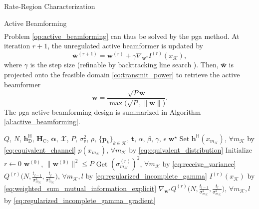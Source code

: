 \begin{section}{Rate-Region Characterization}
\begin{subsection}{Active Beamforming}
\begin{equation}
\begin{split}
			\end{split}
		\end{equation}
		Problem \eqref{op:active_beamforming} can thus be solved by the \gls{pga} method.
		At iteration $r+1$, the unregulated active beamformer is updated by
		\begin{equation}
			\bar{\mathbf{w}}^{(r+1)} = \mathbf{w}^{(r)}+\gamma\nabla_{\mathbf{w}^*} I^{(r)}(x_{\mathcal{K}}),
			\label{eq:beamforming_gradient_ascent}
		\end{equation}
		where $\gamma$ is the step size (refinable by backtracking line search \cite[Section 9.2]{Boyd2004}).
		Then, $\bar{\mathbf{w}}$ is projected onto the feasible domain \eqref{co:transmit_power} to retrieve the active beamformer
		\begin{equation}
			\mathbf{w} = \frac{\sqrt{P} \bar{\mathbf{w}}}{\max\bigl(\sqrt{P},\lVert\bar{\mathbf{w}}\rVert\bigr)}.
			\label{eq:beamforming_projection}
		\end{equation}
		The \gls{pga} active beamforming design is summarized in Algorithm \ref{al:active_beamforming}.
		\begin{algorithm}[!t]
			\caption{Active Beamforming Optimization by \gls{pga}}
			\label{al:active_beamforming}
			\begin{algorithmic}[1]
				\Require $Q$, $N$, $\mathbf{h}_{\text{D}}^\mathsf{H}$, $\mathbf{H}_{\text{C}}$, $\mathbf{\alpha}$, $\mathcal{X}$, $P$, $\sigma_v^2$, $\rho$, $\{\mathbf{p}_k\}_{k \in \mathcal{K}}$, $\mathbf{t}$, $\alpha$, $\beta$, $\gamma$, $\epsilon$
				\Ensure $\mathbf{w}^\star$
				\State Set $\mathbf{h}^\mathsf{H}(x_{m_{\mathcal{K}}})$, $\forall m_{\mathcal{K}}$ by \eqref{eq:equivalent_channel}
				\State \phantom{Set} $p(x_{m_{\mathcal{K}}})$, $\forall m_{\mathcal{K}}$ by \eqref{eq:equivalent_distribution}
				\State Initialize $r \gets 0$
				\State \phantom{Initialize} $\mathbf{w}^{(0)}$, $\lVert\mathbf{w}^{(0)}\rVert^2 \le P$
				\State Get $(\sigma_{m_{\mathcal{K}}}^{(r)})^2$, $\forall m_{\mathcal{K}}$ by \eqref{eq:receive_variance} \label{st:gradient_descent_begin}
				\State \phantom{Get} $Q^{(r)}\bigl(N,\frac{t_{l-1}}{\sigma_{m_{\mathcal{K}}}^2},\frac{t_l}{\sigma_{m_{\mathcal{K}}}^2}\bigr)$, $\forall m_{\mathcal{K}},l$ by \eqref{eq:regularized_incomplete_gamma}
				\State \phantom{Get} $I^{(r)}(x_{\mathcal{K}})$ by \eqref{eq:weighted_sum_mutual_information_explicit} \label{st:gradient_descent_end}
				\State \phantom{Get} $\nabla_{\mathbf{w}^*} Q^{(r)}\bigl(N,\frac{t_{l-1}}{\sigma_{m_{\mathcal{K}}}^2},\frac{t_l}{\sigma_{m_{\mathcal{K}}}^2}\bigr)$, $\forall m_{\mathcal{K}},l$ by \eqref{eq:regularized_incomplete_gamma_gradient} \label{st:gradient_update_start}

\end{algorithmic}
\end{algorithm}
\end{subsection}
\end{section}
